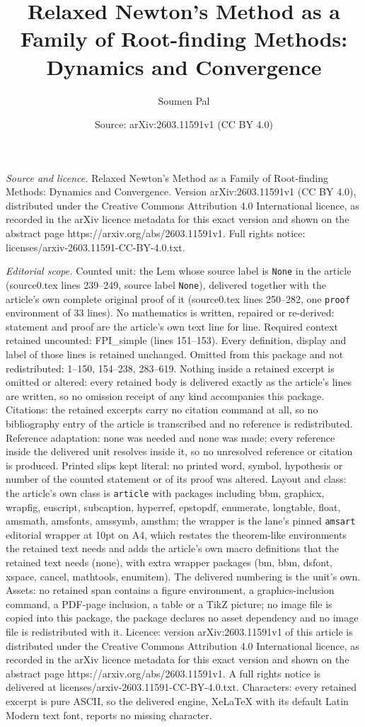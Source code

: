 \documentclass[10pt,a4paper]{amsart}
\title[Relaxed Newton's Method as a Family of Root-finding Methods:]{Relaxed Newton's Method as a Family of Root-finding Methods: Dynamics and Convergence}
\author{Soumen Pal}
\date{Source: arXiv:2603.11591v1 (CC BY 4.0)}
\begin{document}
\maketitle

\noindent\emph{Source and licence.} Relaxed Newton's Method as a Family of Root-finding Methods: Dynamics and Convergence. Version arXiv:2603.11591v1 (CC BY 4.0), distributed under the Creative Commons Attribution 4.0 International licence, as recorded in the arXiv licence metadata for this exact version and shown on the abstract page https://arxiv.org/abs/2603.11591v1. Full rights notice: licenses/arxiv-2603.11591-CC-BY-4.0.txt.\par\smallskip

\noindent\textit{Editorial scope.} Counted unit: the Lem whose source label is \texttt{None} in the article (source0.tex lines 239--249, source label \texttt{None}), delivered together with the article's own complete original proof of it (source0.tex lines 250--282, one \texttt{proof} environment of 33 lines). No mathematics is written, repaired or re-derived: statement and proof are the article's own text line for line. Required context retained uncounted: FPI\_simple (lines 151--153). Every definition, display and label of those lines is retained unchanged. Omitted from this package and not redistributed: 1--150, 154--238, 283--619. Nothing inside a retained excerpt is omitted or altered: every retained body is delivered exactly as the article's lines are written, so no omission receipt of any kind accompanies this package. Citations: the retained excerpts carry no citation command at all, so no bibliography entry of the article is transcribed and no reference is redistributed. Reference adaptation: none was needed and none was made; every reference inside the delivered unit resolves inside it, so no unresolved reference or citation is produced. Printed slips kept literal: no printed word, symbol, hypothesis or number of the counted statement or of its proof was altered. Layout and class: the article's own class is \texttt{article} with packages including bbm, graphicx, wrapfig, euscript, subcaption, hyperref, epstopdf, enumerate, longtable, float, amsmath, amsfonts, amssymb, amsthm; the wrapper is the lane's pinned \texttt{amsart} editorial wrapper at 10pt on A4, which restates the theorem-like environments the retained text needs and adds the article's own macro definitions that the retained text needs (none), with extra wrapper packages (bm, bbm, dsfont, xspace, cancel, mathtools, enumitem). The delivered numbering is the unit's own. Assets: no retained span contains a figure environment, a graphics-inclusion command, a PDF-page inclusion, a table or a TikZ picture; no image file is copied into this package, the package declares no asset dependency and no image file is redistributed with it. Licence: version arXiv:2603.11591v1 of this article is distributed under the Creative Commons Attribution 4.0 International licence, as recorded in the arXiv licence metadata for this exact version and shown on the abstract page https://arxiv.org/abs/2603.11591v1. A full rights notice is delivered at licenses/arxiv-2603.11591-CC-BY-4.0.txt. Characters: every retained excerpt is pure ASCII, so the delivered engine, XeLaTeX with its default Latin Modern text font, reports no missing character.
\end{document}
